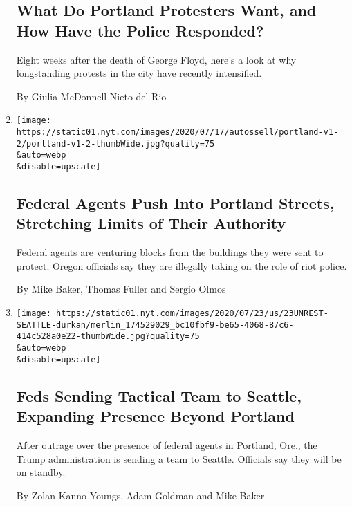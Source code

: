 \begin{enumerate}
  \hypertarget{what-do-portland-protesters-want-and-how-have-the-police-responded}{%
  \subsection{What Do Portland Protesters Want, and How Have the Police
  Responded?}\label{what-do-portland-protesters-want-and-how-have-the-police-responded}}

  Eight weeks after the death of George Floyd, here's a look at why
  longstanding protests in the city have recently intensified.

  By Giulia McDonnell Nieto del Rio
\item
  \href{/2020/07/25/us/portland-federal-legal-jurisdiction-courts.html}{}

  \texttt{[image: https://static01.nyt.com/images/2020/07/17/autossell/portland-v1-2/portland-v1-2-thumbWide.jpg?quality=75\\\&auto=webp\\\&disable=upscale]}

  \hypertarget{federal-agents-push-into-portland-streets-stretching-limits-of-their-authority}{%
  \subsection{Federal Agents Push Into Portland Streets, Stretching
  Limits of Their
  Authority}\label{federal-agents-push-into-portland-streets-stretching-limits-of-their-authority}}

  Federal agents are venturing blocks from the buildings they were sent
  to protect. Oregon officials say they are illegally taking on the role
  of riot police.

  By Mike Baker, Thomas Fuller and Sergio Olmos
\item
  \href{/2020/07/23/us/seattle-protests-feds.html}{}

  \texttt{[image: https://static01.nyt.com/images/2020/07/23/us/23UNREST-SEATTLE-durkan/merlin\_174529029\_bc10fbf9-be65-4068-87c6-414c528a0e22-thumbWide.jpg?quality=75\\\&auto=webp\\\&disable=upscale]}

  \hypertarget{feds-sending-tactical-team-to-seattle-expanding-presence-beyond-portland}{%
  \subsection{Feds Sending Tactical Team to Seattle, Expanding Presence
  Beyond
  Portland}\label{feds-sending-tactical-team-to-seattle-expanding-presence-beyond-portland}}

  After outrage over the presence of federal agents in Portland, Ore.,
  the Trump administration is sending a team to Seattle. Officials say
  they will be on standby.

  By Zolan Kanno-Youngs, Adam Goldman and Mike Baker
\end{enumerate}

